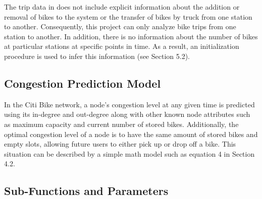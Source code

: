 \documentclass[times, 10pt,twocolumn]{article}
\begin{document}
The trip data in \cite{dataset} does not include explicit information about the addition or removal of bikes to the system or the transfer of bikes by truck from one station to another. Consequently, this project can only analyze bike trips from one station to another. In addition, there is no information about the number of bikes at particular stations at specific points in time. As a result, an initialization procedure is used to infer this information (see Section 5.2).

\subsection{Congestion Prediction Model}

In the Citi Bike network, a node's congestion level at any given time is predicted using its in-degree and out-degree along with other known node attributes such as maximum capacity and current number of stored bikes. Additionally, the optimal congestion level of a node is to have the same amount of stored bikes and empty slots, allowing future users to either pick up or drop off a bike. This situation can be described by a simple math model such as equation 4 in Section 4.2.


\subsection{Sub-Functions and Parameters}
\end{document}
